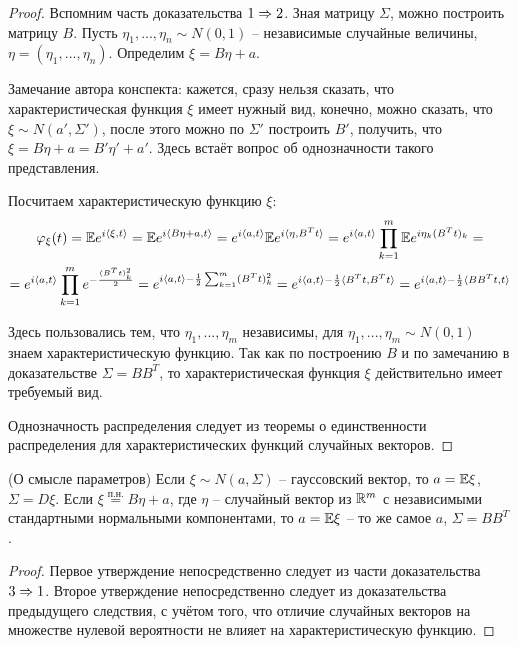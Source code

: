 \begin{proof}
    Вспомним часть доказательства $1 \Rightarrow 2$. Зная матрицу $\Sigma$, можно построить матрицу $B$. Пусть $\eta_1, ..., \eta_n \sim N(0, 1)$ -- независимые случайные величины, $\eta = (\eta_1, ..., \eta_n)$. Определим $\xi = B \eta + a$.

    Замечание автора конспекта: кажется, сразу нельзя сказать, что характеристическая функция $\xi$ имеет нужный вид, конечно, можно сказать, что $\xi \sim N(a', \Sigma')$, после этого можно по $\Sigma'$ построить $B'$, получить, что $\xi = B \eta + a = B' \eta' + a'$. Здесь встаёт вопрос об однозначности такого представления.

    Посчитаем характеристическую функцию $\xi$:
    \large
    \begin{multline*}
        \varphi_\xi(t) = \mathbb{E} e^{i \langle \xi, t \rangle} = \mathbb{E} e^{i \langle B \eta + a, t \rangle} = e^{i \langle a, t \rangle} \mathbb{E} e^{i \langle \eta, B^T t \rangle} = e^{i \langle a, t \rangle} \prod_{k=1}^m \mathbb{E} e^{i \eta_k (B^T t)_k} =
        \\
        = e^{i \langle a, t \rangle} \prod_{k=1}^m e^{-\frac{(B^T t)_k^2}{2}} = e^{i \langle a, t \rangle - \frac{1}{2} \sum_{k=1}^m (B^T t)_k^2} = e^{i \langle a, t \rangle - \frac{1}{2} \langle B^T t, B^T t \rangle} = e^{i \langle a, t \rangle - \frac{1}{2} \langle B B^T t, t \rangle}
    \end{multline*}
    \normalsize

    Здесь пользовались тем, что $\eta_1, ..., \eta_m$ независимы, для $\eta_1, ..., \eta_m \sim N(0, 1)$ знаем характеристическую функцию. Так как по построению $B$ и по замечанию в доказательстве $\Sigma = B B^T$, то характеристическая функция $\xi$ действительно имеет требуемый вид.

    Однозначность распределения следует из теоремы о единственности распределения для характеристических функций случайных векторов.
\end{proof}

\begin{corollary} (О смысле параметров)
    Если $\xi \sim N(a, \Sigma)$ -- гауссовский вектор, то $a = \mathbb{E}\xi$, $\Sigma = D\xi$. Если $\xi \stackrel{\text{п.н.}}{=} B\eta + a$, где $\eta$ -- случайный вектор из $\mathbb{R}^m$ с независимыми стандартными нормальными компонентами, то $a = \mathbb{E}\xi$ -- то же самое $a$, $\Sigma = B B^T$.
\end{corollary}

\begin{proof}
    Первое утверждение непосредственно следует из части доказательства $3 \Rightarrow 1$. Второе утверждение непосредственно следует из доказательства предыдущего следствия, с учётом того, что отличие случайных векторов на множестве нулевой вероятности не влияет на характеристическую функцию.
\end{proof}

